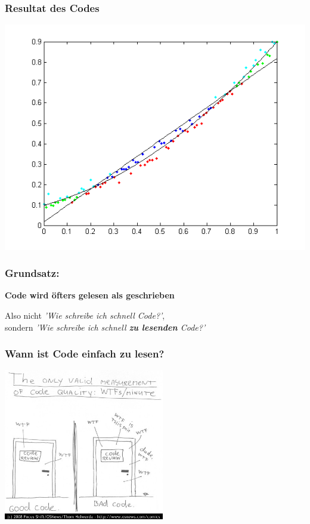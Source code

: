 \documentclass[handout]{beamer}
\begin{document}
\begin{frame}
    \frametitle{Resultat des Codes}
    \begin{center}
        \includegraphics[width=0.8\linewidth]{GrafikResultat.png}
    \end{center}
\end{frame}


\begin{frame}
    \frametitle{Grundsatz:}
    \begin{center}
        \huge \bf Code wird öfters gelesen als geschrieben
    \end{center}
    \vspace{2em}\pause
    Also nicht \textit{'Wie schreibe ich schnell Code?'}, \\
    sondern \textit{'Wie schreibe ich schnell \textbf{zu lesenden} Code?'}
\end{frame}

\begin{frame}
    \frametitle{Wann ist Code einfach zu lesen?}
    \begin{center}
        \includegraphics[width=7cm]{wtfm.jpg}
    \end{center}
\end{frame}
\end{document}
